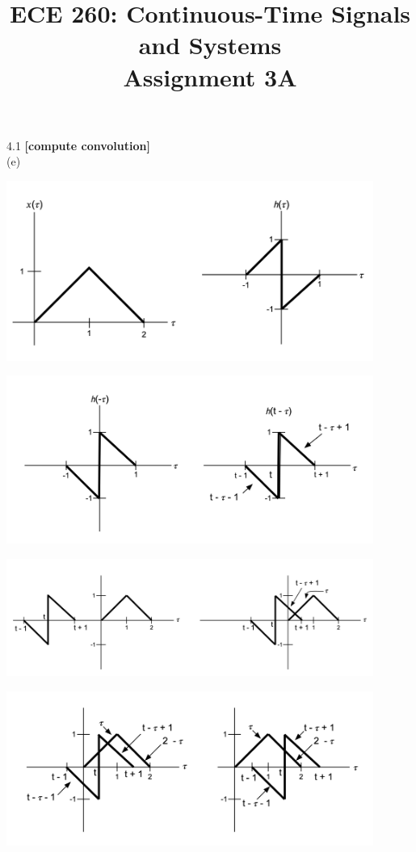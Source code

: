 \documentclass{article}
\title{%
   ECE 260: Continuous-Time Signals and Systems\\
    Assignment 3A\\
    }
\date{}
\begin{document}
\maketitle

4.1 {\bf [compute convolution]}\\
(e)
\begin{center}
    \includegraphics[width=0.9\textwidth]{41e1.png}
\end{center}
\begin{center}
    \includegraphics[width=0.9\textwidth]{41e2.png}
\end{center}
\begin{center}
    \includegraphics[width=0.9\textwidth]{41e3.png}
\end{center}
\begin{center}
    \includegraphics[width=0.9\textwidth]{41e4.png}
\end{center}
\end{document}
